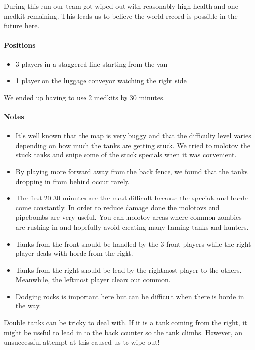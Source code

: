 During this run our team got wiped out with reasonably high health and one medkit remaining. This leads us to believe the world record is possible in the future here.

\paragraph{Positions}
\begin{itemize}
\item 3 players in a staggered line starting from the van
\item 1 player on the luggage conveyor watching the right side
\end{itemize}

We ended up having to use 2 medkits by 30 minutes.

\paragraph{Notes}
\begin{itemize}
\item It's well known that the map is very buggy and that the difficulty level varies depending on how much the tanks are getting stuck. We tried to molotov the stuck tanks and snipe some of the stuck specials when it was convenient.
\item By playing more forward away from the back fence, we found that the tanks dropping in from behind occur rarely.
\item The first 20-30 minutes are the most difficult because the specials and horde come constantly. In order to reduce damage done the molotovs and pipebombs are very useful. You can molotov areas where common zombies are rushing in and hopefully avoid creating many flaming tanks and hunters.
\item Tanks from the front should be handled by the 3 front players while the right player deals with horde from the right.
\item Tanks from the right should be lead by the rightmost player to the others. Meanwhile, the leftmost player clears out common.
\item Dodging rocks is important here but can be difficult when there is horde in the way.
\end{itemize}

Double tanks can be tricky to deal with. If it is a tank coming from the right, it might be useful to lead in to the back counter so the tank climbs. However, an unsuccessful attempt at this caused us to wipe out!

